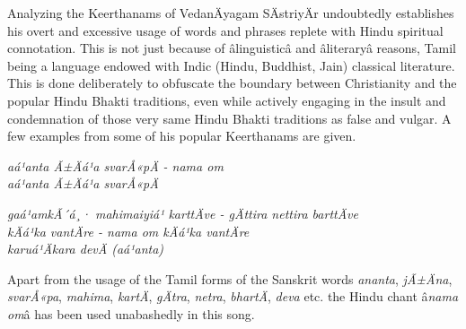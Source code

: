 \newpage

Analyzing the Keerthanams of VedanÄyagam SÄstriyÄr undoubtedly establishes his overt and excessive usage of words and phrases replete with Hindu spiritual connotation. This is not just because of âlinguisticâ and âliteraryâ reasons, Tamil being a language endowed with Indic (Hindu, Buddhist, Jain) classical literature. This is done deliberately to obfuscate the boundary between Christianity and the popular Hindu Bhakti traditions, even while actively engaging in the insult and condemnation of those very same Hindu Bhakti traditions as false and vulgar. A few examples from some of his popular Keerthanams are given.

\begin{myquote}
\textit{aá¹anta Ã±Äá¹a svarÅ«pÄ - nama om\\ aá¹anta Ã±Äá¹a svarÅ«pÄ}
\end{myquote}

\begin{myquote}
\textit{gaá¹amkÃ´á¸· mahimaiyiá¹ karttÄve - gÄttira nettira barttÄve \\ kÄá¹ka vantÄre - nama om kÄá¹ka vantÄre\\ karuá¹Äkara devÄ (aá¹anta) }
\end{myquote}

\begin{myquote}
\end{myquote}

\begin{myquote}
\end{myquote}

Apart from the usage of the Tamil forms of the Sanskrit words \textit{ananta}, \textit{jÃ±Äna}, \textit{svarÅ«pa}, \textit{mahima}, \textit{kartÄ}, \textit{gÄtra}, \textit{netra}, \textit{bhartÄ}, \textit{deva} etc. the Hindu chant â\textit{nama om}â has been used unabashedly in this song.

